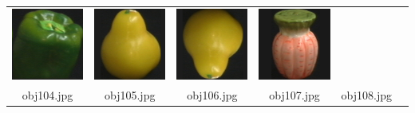 \begin{table}[H]
\begin{tabu}{|cccccc|}
    \includegraphics[width=0.1\linewidth,height=0.1\linewidth]{imagens/coil_100/legumes_frutas/obj82__0.png} &
    \includegraphics[width=0.1\linewidth,height=0.1\linewidth]{imagens/coil_100/legumes_frutas/obj83__0.png} &
    \includegraphics[width=0.1\linewidth,height=0.1\linewidth]{imagens/coil_100/legumes_frutas/obj83__0_1.png} &
    \includegraphics[width=0.1\linewidth,height=0.1\linewidth]{imagens/coil_100/legumes_frutas/obj86__0.png} &
    \\
    \scriptsize{obj104.jpg} & \scriptsize{obj105.jpg} & \scriptsize{obj106.jpg} &
    \scriptsize{obj107.jpg} & \scriptsize{obj108.jpg} &
  \end{tabu}
\end{table}

